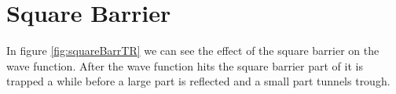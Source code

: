 \documentclass[11pt]{article}
\newlength\figureheight
\newlength\figurewidth
\newif\iftikz
\begin{document}
\section{Square Barrier}
In figure \ref{fig:squareBarrTR} we can see the effect of the square barrier on the wave function. After the wave function hits the square barrier part of it is trapped a while before a large part is reflected and a small part tunnels trough. 
\iftikz
\begin{figure}[H]
	\centering
	\begin{subfigure}{.9\linewidth}
		\setlength\figureheight{.5\linewidth} 
		\setlength\figurewidth{.9\linewidth}
		
		\caption{The numerical solution of $|\psi_n(x,t)|^2$ after it has hit the square barrier.}
		\label{fig:squareBarrfPlot}
	\end{subfigure}
	\begin{subfigure}{.9\linewidth}
		\setlength\figureheight{.5\linewidth} 
		\setlength\figurewidth{.9\linewidth}
		
		\caption{Here we clearly see the transmission and reflection before and after the wave function hits the square barrier.}
		\label{fig:squareBarrTR}
	\end{subfigure}
	\label{fig:squareBarr}
	\caption{Here we depict the effect of the wave function hitting the square barrier. Note in figure \ref{fig:squareBarrTR} how a certain part of the wave function is trapped inside for while before a large part is reflected and a small part tunnels through.}
\end{figure}
\fi
\end{document}
